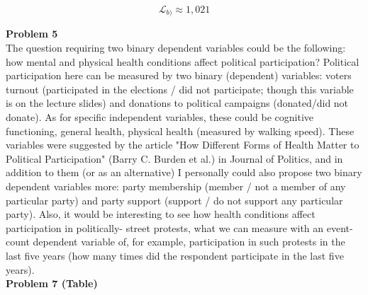 \documentclass{article}
\begin{document}
$$\mathcal{L}_{b)} \approx 1,021$$

\textbf{Problem 5}
\\

The question requiring two binary dependent variables could be the following: how mental and physical health conditions affect political participation? Political participation here can be measured by two binary (dependent) variables: voters turnout (participated in the elections / did not participate; though this variable is on the lecture slides) and donations to political campaigns (donated/did not donate). As for specific independent variables, these could be cognitive functioning, general health, physical health (measured by walking speed). These variables were suggested by the article "How Different Forms of Health Matter to Political Participation" (Barry C. Burden et al.) in Journal of Politics, and in addition to them (or as an alternative) I personally could also propose two binary dependent variables more: party membership (member / not a member of any particular party) and party support (support / do not support any particular party). Also, it would be interesting to see how health conditions affect participation in politically- street protests, what we can measure with an event-count dependent variable of, for example, participation in such protests in the last five years (how many times did the respondent participate in the last five years). 
\\

\textbf{Problem 7 (Table)}
\\
\end{document}
